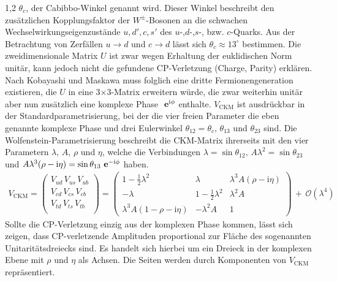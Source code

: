 \documentclass[11pt,a4paper,twoside]{report}
\begin{document}
\begin{spacing}{1,2}
$\theta_c$, der Cabibbo-Winkel genannt wird. Dieser Winkel beschreibt den zusätzlichen Kopplungsfaktor der $W^\pm$-Bosonen an die schwachen 
Wechselwirkungseigenzustände $u, d', c, s'$ des $u$-,$d$-,$s$-, bzw. $c$-Quarks. Aus der Betrachtung von Zerfällen $u\rightarrow d$ und $c\rightarrow d$ lässt
sich $\theta_c \approx 13^\circ$ bestimmen. Die zweidimensionale Matrix $U$ ist zwar wegen Erhaltung der euklidischen Norm unitär, kann jedoch nicht die 
gefundene CP-Verletzung (Charge, Parity) erklären. Nach Kobayashi und Maskawa muss folglich eine dritte Fermionengeneration existieren,
die $U$ in eine 3$\times$3-Matrix erweitern würde, die zwar weiterhin unitär aber nun zusätzlich eine komplexe Phase $\ \mathbf{e}^{\text{i}\phi}$ enthalte. $V_{\text{CKM}}$ ist
ausdrückbar in der Standardparametrisierung, bei der die vier freien Parameter die eben genannte komplexe Phase und drei Eulerwinkel 
$\theta_{12} = \theta_c,\, \theta_{13}$ und $\theta_{23}$ sind. Die Wolfenstein-Parametrisierung beschreibt die CKM-Matrix ihrerseits mit den vier Parametern
$\lambda,\, A,\, \rho$ und $\eta$, welche die Verbindungen $\lambda = \sin\theta_{12},\, A\lambda^2 = \sin\theta_{23}$ und $A\lambda^3(\rho-\text{i}\eta) = \sin\theta_{13}\ \mathbf{e}^{-\text{i}\phi}$
haben.
\begin{align}
 V_{\text{CKM}} = \begin{pmatrix}
            V_{ud}\,V_{us}\,V_{ub}\\
            V_{cd}\,V_{cs}\,V_{cb}\\
            V_{td}\,V_{ts}\,V_{tb}\\
           \end{pmatrix} = \begin{pmatrix}
			    1-\frac12\lambda^2 & \lambda & \lambda^3A(\rho-\text{i}\eta)\\
			    -\lambda & 1-\frac12 \lambda^2 &\lambda^2A\\
			    \lambda^3A(1-\rho-\text{i}\eta) &-\lambda^2A & 1
			    \end{pmatrix} \, +  \, \mathcal{O}(\lambda^4)
\end{align}
Sollte die CP-Verletzung einzig aus der komplexen Phase kommen, lässt sich zeigen, dass CP-verletzende Amplituden proportional zur Fläche des sogenannten
Unitaritätsdreiecks sind. Es handelt sich hierbei um ein Dreieck in der komplexen Ebene mit $\rho$ und $\eta$ als Achsen. Die Seiten werden durch Komponenten
von $V_{\text{CKM}}$ repräsentiert.


\end{spacing}
\end{document}
